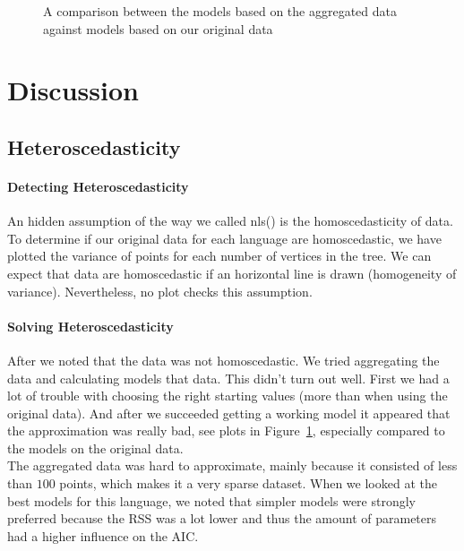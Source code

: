 \documentclass[paper=a4, fontsize=11pt]{scrartcl} %
\begin{document}
\begin{figure}
\begin{minipage}{\textwidth}
\begin{minipage}{.5\textwidth}
  \label{fig:cat4}
\end{minipage}
\end{minipage}
\caption{A comparison between the models based on the aggregated data against models based on our original data}\label{fig:compAgg}
\end{figure}


\newpage
\section{Discussion}
\subsection{Heteroscedasticity}
\paragraph{Detecting Heteroscedasticity}
An hidden assumption of the way we called nls() is the homoscedasticity of data. To determine if our original data for each language are homoscedastic, we have plotted the variance of points for each number of vertices in the tree. We can expect that data are homoscedastic if an horizontal line is drawn (homogeneity of variance). Nevertheless, no plot checks this assumption.

\paragraph{Solving Heteroscedasticity}
After we noted that the data was not homoscedastic. We tried aggregating the data and calculating models that data. This didn't turn out well. First we had a lot of trouble with choosing the right starting values (more than when using the original data). And after we succeeded getting a working model it appeared that the approximation was really bad, see plots in Figure~\ref{fig:compAgg}, especially compared to the models on the original data.\\

The aggregated data was hard to approximate, mainly because it consisted of less than $100$ points, which makes it a very sparse dataset. When we looked at the best models for this language, we noted that simpler models were strongly preferred because the RSS was a lot lower and thus the amount of parameters had a higher influence on the AIC.\\
\end{document}
